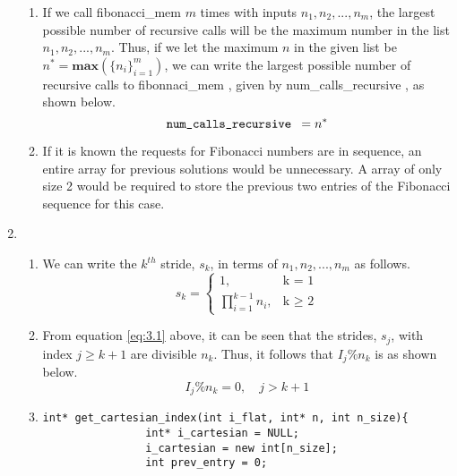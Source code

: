 \documentclass[11pt]{article}
\begin{document}
\begin{enumerate}[leftmargin=0.9in]
\begin{enumerate}[leftmargin=0.3in]
      \item If we call {\selectfont fibonacci\_mem} $m$ times with inputs $n_1, n_2, ..., n_m$, the largest possible number of recursive calls will be the maximum number in the list $n_1, n_2, ..., n_m$. Thus, if we let the maximum $n$ in the given list be $n^* = \textbf{max}(\{n_i\}_{i=1}^m)$, we can write the largest possible number of recursive calls to {\selectfont fibonnaci\_mem }, given by {\selectfont num\_calls\_recursive }, as shown below.
        \begin{equation}
          \text{{\fontfamily{cmtt}\selectfont num\_calls\_recursive }} = n^* 
        \end{equation}

      \item If it is known the requests for Fibonacci numbers are in sequence, an entire array for previous solutions would be unnecessary. A array of only size 2 would be required to store the previous two entries of the Fibonacci sequence for this case.

   \end{enumerate} %

\item %
   \begin{enumerate}[leftmargin=0.3in]
      \item
        We can write the $k^{th}$ stride, $s_k$, in terms of $n_1, n_2, ..., n_m$ as follows.
        \begin{equation} \label{eq:3.1} 
          s_k = \begin{cases} 
            1, & \text{k = 1} \\
            \prod_{i = 1}^{k-1} n_i, & \text{k $\geq$ 2}
          \end{cases}
        \end{equation}

      \item
        From equation \ref{eq:3.1} above, it can be seen that the strides, $s_j$, with index $j \geq k + 1$ are divisible $n_k$. Thus, it follows that $I_j \% n_k$ is as shown below.
        \begin{equation}
          I_j \% n_k = 0, \quad j > k+1
        \end{equation}

      \item 
         \begin{lstlisting}[caption={}, label={lst:3.3}, style=customCpp]
            int* get_cartesian_index(int i_flat, int* n, int n_size){
                int* i_cartesian = NULL;
                i_cartesian = new int[n_size];
                int prev_entry = 0;
                

\end{lstlisting}
\end{enumerate}
\end{enumerate}
\end{document}
